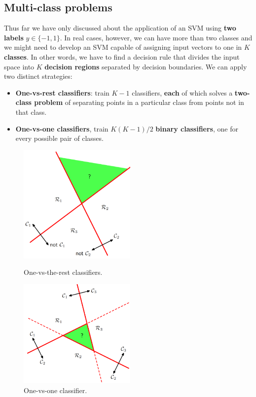 \subsection{Multi-class problems}
Thus far we have only discussed about the application of an SVM using \textbf{two labels} $y \in\{-1,1\}$. In real cases, however, we can have more than two classes and we might need to develop an SVM capable of assigning input vectors to one in $K$ \textbf{classes}. In other words, we have to find a decision rule that divides the input space into $K$ \textbf{decision regions} separated by decision boundaries. 
We can apply two distinct strategies:
\begin{itemize}
	\item \textbf{One-vs-rest classifiers}: train $K-1$ classifiers, \textbf{each} of which solves a \textbf{two-class problem} of separating points in a particular class from points not in that class.
	
	\item \textbf{One-vs-one classifiers}, train $K(K-1)/2$ \textbf{binary classifiers}, one for every possible pair of classes.
	
\end{itemize}

\begin{figure}[!h]
	\begin{minipage}[t]{0.5\linewidth}
		\centering
		\includegraphics[width=0.51\textwidth]{img/onevsrest.png}
		\caption{One-vs-the-rest classifiers.}
	\end{minipage}
	\hspace{0.1cm}
	\begin{minipage}[t]{0.5\linewidth} 
		\centering
		\includegraphics[width=0.51\textwidth]{img/onevsone.png}
		\caption{One-vs-one classifier.}
	\end{minipage}        
\end{figure} 

